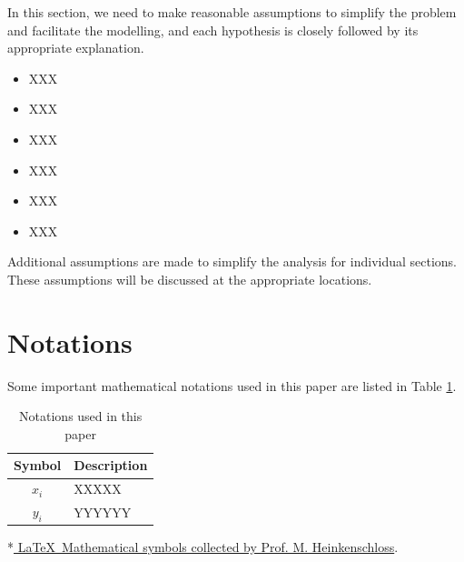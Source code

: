 \documentclass[12pt]{article}  %
\begin{document}
 In this section, we need to make reasonable assumptions to simplify the problem and facilitate the modelling, and each hypothesis is closely followed by its appropriate explanation.
 
 \begin{itemize}
     \setlength{\parsep}{0ex} %
     \setlength{\topsep}{2ex} %
     \setlength{\itemsep}{1ex} %
     \item[\bfseries \textit{Assumption} 1:]  XXX
     \item[\bfseries \textit{Explanation:}]  XXX
     \vspace{1ex}
     \item[\bfseries \textit{Assumption} 2:]  XXX
     \item[\bfseries \textit{Explanation:}]  XXX
     \vspace{1ex}
         \item[\bfseries \textit{Assumption} 3:]  XXX
     \item[\bfseries \textit{Explanation:}]  XXX
 \end{itemize}
 
 Additional assumptions are made to simplify the analysis for individual sections. These assumptions will be discussed at the appropriate locations.
 
 \section{Notations}
 Some important mathematical notations used in this paper are listed in Table \ref{tab1}. 
 \begin{table}[htbp]
 \begin{center}
 \caption{Notations used in this paper}
 \begin{tabular}{cl} %
 \toprule[2pt]
 \multicolumn{1}{m{4cm}}{\centering Symbol}
 &\multicolumn{1}{m{10cm}}{\centering Description }\\  %
 \midrule
 $x_i$   & XXXXX \\
 $y_i$   & YYYYYY \\
 \bottomrule[2pt]
 \end{tabular}	\label{tab1} %
  \begin{tablenotes}
         \footnotesize
         \item[*] *\href{https://www.caam.rice.edu/~heinken/latex/symbols.pdf}{ \LaTeX~Mathematical symbols collected by Prof. M. Heinkenschloss}. %
       \end{tablenotes}
 \end{center}
 \end{table} 
 \vspace{-1cm} 
 
\end{document}
